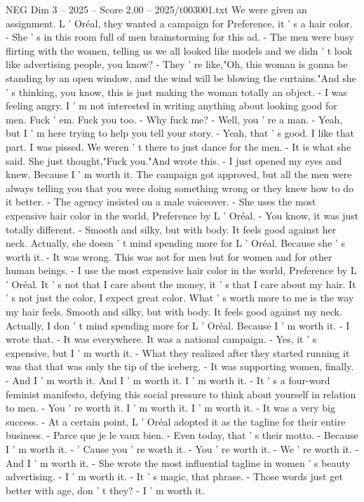 \begin{textsample}{NEG Dim 3 – 2025 – Score 2.00 – 2025/t003001.txt}
We were given an assignment.
L ' Oréal, they wanted a campaign for Preference, it ' s a hair color. - She ' s in this room full of men brainstorming for this ad. - The men were busy flirting with the women, telling us we all looked like models and we didn ' t look like advertising people, you know? - They ' re like,"Oh, this woman is gonna be standing by an open window, and the wind will be blowing the curtains."And she ' s thinking, you know, this is just making the woman totally an object. - I was feeling angry.
I ' m not interested in writing anything about looking good for men.
Fuck ' em.
Fuck you too. - Why fuck me? - Well, you ' re a man. - Yeah, but I ' m here trying to help you tell your story. - Yeah, that ' s good.
I like that part.
I was pissed.
We weren ' t there to just dance for the men. - It is what she said.
She just thought,"Fuck you."And wrote this. - I just opened my eyes and knew.
Because I ' m worth it.
The campaign got approved, but all the men were always telling you that you were doing something wrong or they knew how to do it better. - The agency insisted on a male voiceover. - She uses the most expensive hair color in the world, Preference by L ' Oréal. - You know, it was just totally different. - Smooth and silky, but with body.
It feels good against her neck.
Actually, she doesn ' t mind spending more for L ' Oréal.
Because she ' s worth it. - It was wrong.
This was not for men but for women and for other human beings. - I use the most expensive hair color in the world, Preference by L ' Oréal.
It ' s not that I care about the money, it ' s that I care about my hair.
It ' s not just the color, I expect great color.
What ' s worth more to me is the way my hair feels.
Smooth and silky, but with body.
It feels good against my neck.
Actually, I don ' t mind spending more for L ' Oréal.
Because I ' m worth it. - I wrote that. - It was everywhere.
It was a national campaign. - Yes, it ' s expensive, but I ' m worth it. - What they realized after they started running it was that that was only the tip of the iceberg. - It was supporting women, finally. - And I ' m worth it.
And I ' m worth it.
I ' m worth it. - It ' s a four-word feminist manifesto, defying this social pressure to think about yourself in relation to men. - You ' re worth it.
I ' m worth it.
I ' m worth it. - It was a very big success. - At a certain point, L ' Oréal adopted it as the tagline for their entire business. - Parce que je le vaux bien. - Even today, that ' s their motto. - Because I ' m worth it. - ' Cause you ' re worth it. - You ' re worth it. - We ' re worth it. - And I ' m worth it. - She wrote the most influential tagline in women ' s beauty advertising. - I ' m worth it. - It ' s magic, that phrase. - Those words just get better with age, don ' t they? - I ' m worth it.

\end{textsample}
